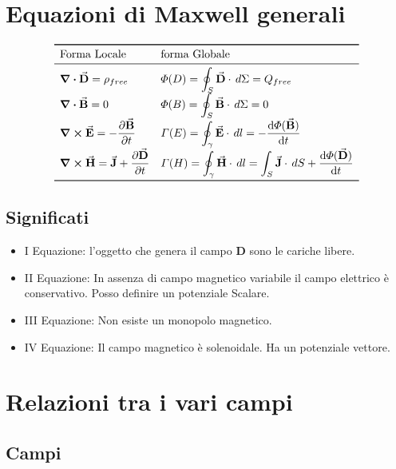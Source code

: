 \documentclass[a4paper]{scrarticle}
\begin{document}
    
\section{Equazioni di Maxwell generali}

\[
\begin{array}{ll}
    \toprule
    \text{Forma Locale} & \text {forma Globale} \\
    \midrule
    \displaystyle \div{\va D} = \rho_{free}             & \displaystyle \varPhi(D)   = \oint_S \va D \cdot \, d\Sigma= Q_{free}\\
    \displaystyle \div{\va B} = 0                       & \displaystyle \varPhi(B)   = \oint_S \va B \cdot \, d\Sigma= 0\\
    \displaystyle \curl{\va E}= -\pdv{\va B}{t}         & \displaystyle \varGamma(E) = \oint_\gamma \va E \cdot \,dl = -\dv{\varPhi(\va B)}{t}\\
    \displaystyle \curl{\va H}= \va J +  \pdv{\va D}{t} & \displaystyle \varGamma(H) = \oint_\gamma \va H \cdot \,dl = \int_S \va J \cdot \,dS + \dv{\varPhi(\va D)}{t}\\
    \bottomrule
\end{array}    
\]

\subsection{Significati}

\begin{itemize}
    \item I Equazione: l'oggetto che genera il campo $\bm D$ sono le cariche libere.
    \item II Equazione: In assenza di campo magnetico variabile il campo elettrico è conservativo. Posso definire un potenziale Scalare.
    \item III Equazione: Non esiste un monopolo magnetico.
    \item IV Equazione: Il campo magnetico è solenoidale. Ha un potenziale vettore.
\end{itemize}


\section{Relazioni tra i vari campi}

\subsection{Campi}
\end{document}

